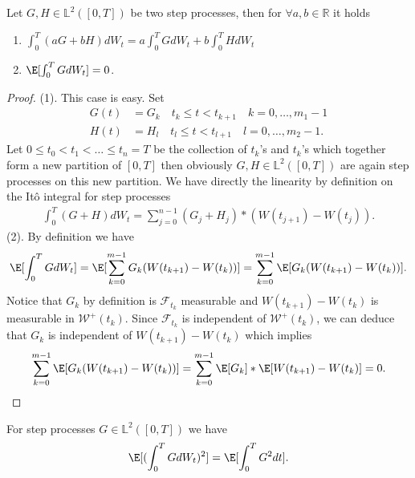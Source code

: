 \begin{prop}
  Let $G,H \in  \mathbb{L}^2([0,T])$  be two step processes, then for $\forall  a,b \in  \mathbb{R}$ it holds 
  \begin{enumerate}
    \item $\int_0^{T}(aG + bH)dW_t  = a \int_0^{T} G dW_t + b \int_0^{T} HdW_t  $
    \item $\E [\int_0^{T}GdW_t] = 0$.
  \end{enumerate}
\end{prop}
\begin{proof}
  (1). This case is easy. Set 
  \begin{align*}
    G(t) &= G_k \quad t_k \le t <t_{k+1} \quad k=0,\ldots,m_1 -1\\
    H(t) &= H_l \quad t_l \le t <t_{l+1} \quad l=0,\ldots,m_2 -1
  .\end{align*}
  Let $0 \le  t_{0}<t_{1}<\ldots \le t_n=T$ be the collection of $t_k$'s and $t_k$'s which together form a new partition
  of $[0,T]$ then obviously $G,H \in  \mathbb{L}^2([0,T])$ are again step processes on this new partition. We have 
  directly the linearity by definition on the It\^o integral for step processes
  \begin{align*}
    \int_0^{T} (G+H)d W_t = \sum_{j=0}^{n-1} (G_j+H_j)*(W(t_{j+1})-W(t_j))
  .\end{align*}
  (2). By definition we have 
  \begin{align*}
    \E[\int_0^{T} GdW_t ] = \E[\sum_{k=0}^{m-1}G_k(W(t_{k+1})-W(t_k)) ] = \sum_{k=0}^{m-1} \E[G_k(W(t_{k+1})- W(t_k))] 
  .\end{align*}
  Notice that $G_k$ by definition is $\mathcal{F}_{t_k}$ measurable and $W(t_{k+1}) - W(t_k)$ is measurable in $\mathcal{W}^{+}(t_k) $. Since
  $\mathcal{F}_{t_k}$ is independent of $\mathcal{W}^{+}(t_k) $, we can deduce that $G_k$ is independent of $W(t_{k+1}) - W(t_k)$ which implies 
  \begin{align*}
    \sum_{k=0}^{m-1} \E[G_k(W(t_{k+1})- W(t_k))]  = \sum_{k=0}^{m-1} \E[G_k]*\E[W(t_{k+1}) - W(t_k)]  =0
  .\end{align*}
\end{proof}
\begin{lemma}
  For step processes $G \in  \mathbb{L}^2([0,T])$  we have 
  \begin{align*}
    \E[(\int_0^{T} G dW_t )^2] = \E[\int_0^{T} G^2 dt ]
  .\end{align*}
\end{lemma}
